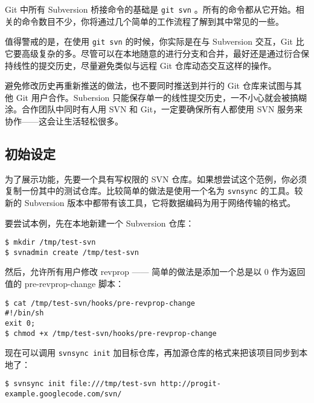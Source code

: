\documentclass[a4paper]{book}
\begin{document}
Git 中所有 Subversion 桥接命令的基础是 \texttt{git svn} 。所有的命令都从它开始。相关的命令数目不少，你将通过几个简单的工作流程了解到其中常见的一些。

值得警戒的是，在使用 \texttt{git svn} 的时候，你实际是在与 Subversion 交互，Git 比它要高级复杂的多。尽管可以在本地随意的进行分支和合并，最好还是通过衍合保持线性的提交历史，尽量避免类似与远程 Git 仓库动态交互这样的操作。

避免修改历史再重新推送的做法，也不要同时推送到并行的 Git 仓库来试图与其他 Git 用户合作。Subersion 只能保存单一的线性提交历史，一不小心就会被搞糊涂。合作团队中同时有人用 SVN 和 Git，一定要确保所有人都使用 SVN 服务来协作------这会让生活轻松很多。

\subsection{初始设定}

为了展示功能，先要一个具有写权限的 SVN 仓库。如果想尝试这个范例，你必须复制一份其中的测试仓库。比较简单的做法是使用一个名为 \texttt{svnsync} 的工具。较新的 Subversion 版本中都带有该工具，它将数据编码为用于网络传输的格式。

要尝试本例，先在本地新建一个 Subversion 仓库：

\begin{shaded}\begin{verbatim}
$ mkdir /tmp/test-svn
$ svnadmin create /tmp/test-svn
\end{verbatim}\end{shaded}

然后，允许所有用户修改 revprop ------ 简单的做法是添加一个总是以 0 作为返回值的 pre-revprop-change 脚本：

\begin{shaded}\begin{verbatim}
$ cat /tmp/test-svn/hooks/pre-revprop-change 
#!/bin/sh
exit 0;
$ chmod +x /tmp/test-svn/hooks/pre-revprop-change
\end{verbatim}\end{shaded}

现在可以调用 \texttt{svnsync init} 加目标仓库，再加源仓库的格式来把该项目同步到本地了：

\begin{shaded}\begin{verbatim}
$ svnsync init file:///tmp/test-svn http://progit-example.googlecode.com/svn/ 
\end{verbatim}\end{shaded}
\end{document}
